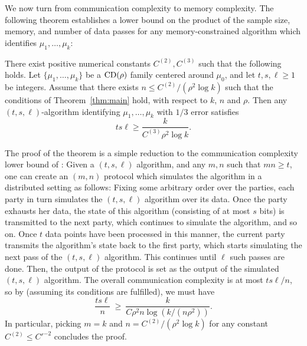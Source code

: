 We now turn from communication complexity to memory complexity. The following theorem establishes a lower bound on the product of the sample size, memory, and number of data passes for any memory-constrained algorithm which identifies $\mu_1,\ldots,\mu_k$: 

\begin{theorem} \label{thm:mem}
There exist positive numerical constants $C^{(2)},C^{(3)}$ such that the following holds. Let $\{ \mu_1, \dots, \mu_k \}$ be a $\mathrm{CD}(\rho)$ family centered around $\mu_0$, and let $t,s,\ell \ge 1$ be integers. Assume that there exists $n \le C^{(2)}/(\rho^2\log k)$ such that the conditions of Theorem~\ref{thm:main} hold, with respect to $k$, $n$ and $\rho$. Then any $(t,s,\ell)$-algorithm identifying $\mu_1, \dots, \mu_k$ with $1/3$ error satisfies
\[
ts\ell \ge \frac{k}{C^{(3)} \rho^2 \log k}.
\]
\end{theorem}
The proof of the theorem is a simple reduction to the communication complexity lower bound of : Given a $(t,s, \ell)$ algorithm, and any $m,n$ such that $mn\geq t$, one can create an $(m,n)$ protocol which simulates the algorithm in a distributed setting as follows: Fixing some arbitrary order over the parties, each party in turn simulates the $(t,s,\ell)$ algorithm over its data. Once the party exhausts her data, the state of this algorithm (consisting of at most $s$ bits) is transmitted to the next party, which continues to simulate the algorithm, and so on. Once $t$ data points have been processed in this manner, the current party transmits the algorithm's state back to the first party, which starts simulating the next pass of the $(t,s,\ell)$ algorithm. This continues until $\ell$ such passes are done. Then, the output of the protocol is set as the output of the simulated $(t,s,\ell)$ algorithm. The overall communication complexity is at most $ts\ell/n$, so by  (assuming its conditions are fulfilled), we must have
\begin{equation}\label{eq:memcom}
\frac{ts\ell}{n}~\geq~\frac{k}{C\rho^2 n\log(k/(n\rho^2))}.
\end{equation}
In particular, picking $m=k$ and $n=C^{(2)}/(\rho^2 \log k)$ for any constant $C^{(2)}\leq C'^{-2}$ concludes the proof.


